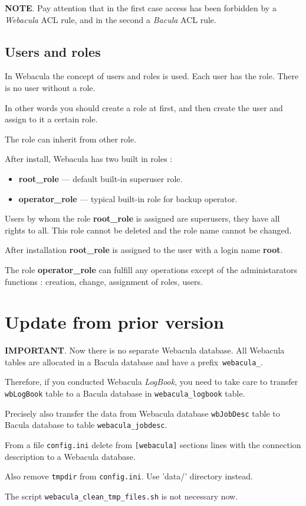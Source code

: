 \documentclass[10pt]{article}
\begin{document}
\textbf{NOTE}.
Pay attention that in the first case access has been forbidden by a \textit{Webacula} ACL rule, 
and in the second a \textit{Bacula} ACL rule.


\subsection{Users and roles}
\label{Setup:Users and roles}

In Webacula the concept of users and roles is used.
Each user has the role. There is no user without a role.

In other words you should create a role at first, and then create the user and assign to it a certain role.

The role can inherit from other role.

After install, Webacula has two built in roles :

\begin{itemize}
  \item \textbf{root\_role} --- default built-in superuser role. 
  \item \textbf{operator\_role} --- typical built-in role for backup operator.
\end{itemize}

Users by whom the role \textbf{root\_role} is assigned are superusers, they have all rights to all.
This role cannot be deleted and the role name cannot be changed.

After installation \textbf{root\_role} is assigned to the user with a login name \textbf{root}.

The role \textbf{operator\_role} can fulfill any operations except of the administarators functions : 
creation, change, assignment of roles, users.



\section{Update from prior version}
\label{Update}

\textbf{IMPORTANT}. Now there is no separate Webacula database.
All Webacula tables are allocated in a Bacula database and have a prefix\texttt{ webacula\_}.

Therefore, if you conducted Webacula \textit{LogBook}, you need to take care to transfer \texttt{wbLogBook} table 
to a Bacula database in \texttt{webacula\_logbook} table.

Precisely also transfer the data from Webacula database \texttt{wbJobDesc} table 
to Bacula database to table \texttt{webacula\_jobdesc}.

From a file \texttt{config.ini} delete from \texttt{[webacula]} sections lines with the connection 
description to a Webacula database.

Also remove \texttt{tmpdir} from \texttt{config.ini}. Use 'data/' directory instead.

The script \texttt{webacula\_clean\_tmp\_files.sh} is not necessary now.
\end{document}
